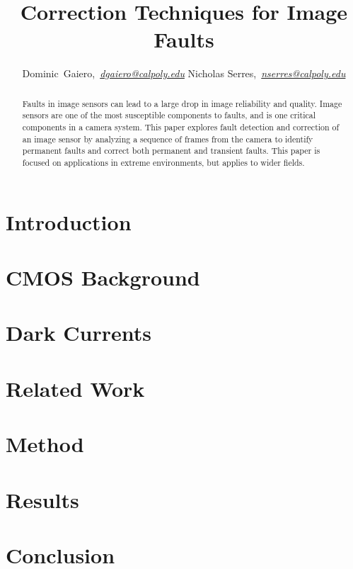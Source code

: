 \documentclass[journal]{IEEEtran}
\begin{document}
\title{Correction Techniques for Image Faults}

\author{Dominic~Gaiero,~\textit{\href{mailto:dgaiero@calpoly.edu}{dgaiero@calpoly.edu}}
    Nicholas Serres,~\textit{\href{mailto:nserres@calopoly.edu}{nserres@calpoly.edu}}}

\maketitle

\begin{abstract}
Faults in image sensors can lead to a large drop in image reliability and quality. Image sensors are one of the most susceptible components to faults, and is one critical components in a camera system. This paper explores fault detection and correction of an image sensor by analyzing a sequence of frames from the camera to identify permanent faults and correct both permanent and transient faults. This paper is focused on applications in extreme environments, but applies to wider fields. 
\end{abstract}

\section{Introduction}

\section{CMOS Background}

\section{Dark Currents}

\section{Related Work} 

\section{Method}

\section{Results}

\section{Conclusion}



{\footnotesize

}
\end{document}
